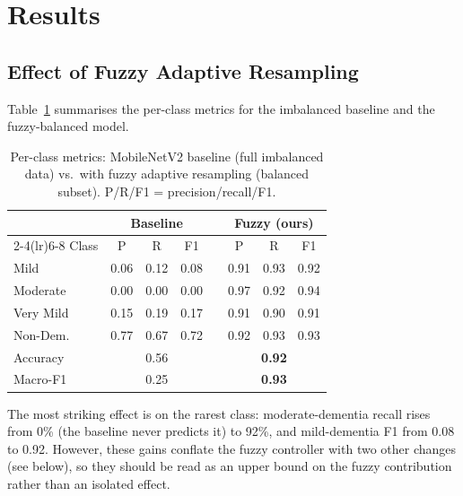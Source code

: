 \documentclass[journal]{IEEEtran}
\begin{document}
\section{Results}
\subsection{Effect of Fuzzy Adaptive Resampling}
Table~\ref{tab:main} summarises the per-class metrics for the imbalanced baseline
and the fuzzy-balanced model.
\begin{table}[t]
\caption{Per-class metrics: MobileNetV2 baseline (full imbalanced data) vs.\ with
fuzzy adaptive resampling (balanced subset). P/R/F1 = precision/recall/F1.}
\label{tab:main}
\centering
\small
\begin{tabular}{l ccc c ccc}
\toprule
& \multicolumn{3}{c}{Baseline} & & \multicolumn{3}{c}{Fuzzy (ours)} \\
\cmidrule(lr){2-4}\cmidrule(lr){6-8}
Class & P & R & F1 & & P & R & F1 \\
\midrule
Mild        & 0.06 & 0.12 & 0.08 & & 0.91 & 0.93 & 0.92 \\
Moderate    & 0.00 & 0.00 & 0.00 & & 0.97 & 0.92 & 0.94 \\
Very Mild   & 0.15 & 0.19 & 0.17 & & 0.91 & 0.90 & 0.91 \\
Non-Dem.    & 0.77 & 0.67 & 0.72 & & 0.92 & 0.93 & 0.93 \\
\midrule
Accuracy    & \multicolumn{3}{c}{0.56} & & \multicolumn{3}{c}{\textbf{0.92}} \\
Macro-F1    & \multicolumn{3}{c}{0.25} & & \multicolumn{3}{c}{\textbf{0.93}} \\
\bottomrule
\end{tabular}
\end{table}

The most striking effect is on the rarest class: moderate-dementia recall rises
from 0\% (the baseline never predicts it) to 92\%, and mild-dementia F1 from 0.08
to 0.92. However, these gains conflate the fuzzy controller with two other
changes (see below), so they should be read as an upper bound on the fuzzy
contribution rather than an isolated effect.
\end{document}
